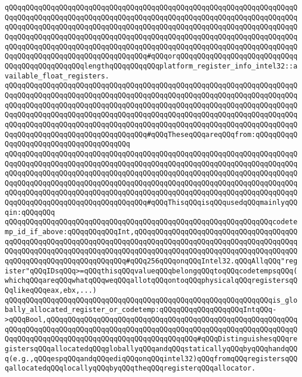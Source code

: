 \verb|qQQqqQQqqQQqqQQqqQQqqQQqqQQqqQQqqQQqqQQqqQQqqQQqqQQqqQQqqQQqqQQqqQQqqQQqqQQqqQQqqQQqqQQqqQQqqQQqqQQqqQQqqQQqqQQqqQQqqQQqqQQqqQQqqQQqqQQqqQQqqQQqqQQqqQQqqQQqqQQqqQQqqQQqqQQqqQQqqQQqqQQqqQQqqQQqqQQqqQQqqQQqqQQqqQQqqQQqqQQqqQQqqQQqqQQqqQQqqQQqqQQqqQQqqQQqqQQqqQQqqQQqqQQqqQQqqQQqqQQqqQQqqQQqqQQqqQQqqQQqqQQqqQQqqQQqqQQqqQQqqQQqqQQqqQQqqQQqqQQqqQQqqQQqqQQqqQQqqQQqqQQqqQQqqQQqqQQqqQQqqQQq#qQQqorqQQqqQQqqQQqqQQqqQQqqQQqqQQqqQQqqQQqqQQqqQQqqQQqlengthqQQqqQQqqQQqplatform_register_info_intel32::available_float_registers.|\newline
\verb|qQQqqQQqqQQqqQQqqQQqqQQqqQQqqQQqqQQqqQQqqQQqqQQqqQQqqQQqqQQqqQQqqQQqqQQqqQQqqQQqqQQqqQQqqQQqqQQqqQQqqQQqqQQqqQQqqQQqqQQqqQQqqQQqqQQqqQQqqQQqqQQqqQQqqQQqqQQqqQQqqQQqqQQqqQQqqQQqqQQqqQQqqQQqqQQqqQQqqQQqqQQqqQQqqQQqqQQqqQQqqQQqqQQqqQQqqQQqqQQqqQQqqQQqqQQqqQQqqQQqqQQqqQQqqQQqqQQqqQQqqQQqqQQqqQQqqQQqqQQqqQQqqQQqqQQqqQQqqQQqqQQqqQQqqQQqqQQqqQQqqQQqqQQqqQQqqQQqqQQqqQQqqQQqqQQqqQQqqQQqqQQq#qQQqTheseqQQqareqQQqfrom:qQQqqQQqqQQqqQQqqQQqqQQqqQQqqQQqqQQqqQQq|\newline
\verb|qQQqqQQqqQQqqQQqqQQqqQQqqQQqqQQqqQQqqQQqqQQqqQQqqQQqqQQqqQQqqQQqqQQqqQQqqQQqqQQqqQQqqQQqqQQqqQQqqQQqqQQqqQQqqQQqqQQqqQQqqQQqqQQqqQQqqQQqqQQqqQQqqQQqqQQqqQQqqQQqqQQqqQQqqQQqqQQqqQQqqQQqqQQqqQQqqQQqqQQqqQQqqQQqqQQqqQQqqQQqqQQqqQQqqQQqqQQqqQQqqQQqqQQqqQQqqQQqqQQqqQQqqQQqqQQqqQQqqQQqqQQqqQQqqQQqqQQqqQQqqQQqqQQqqQQqqQQqqQQqqQQqqQQqqQQqqQQqqQQqqQQqqQQqqQQqqQQqqQQqqQQqqQQqqQQqqQQqqQQqqQQq#qQQqThisqQQqisqQQqusedqQQqmainlyqQQqin:qQQqqQQq|\newline
\newline
\verb|qQQqqQQqqQQqqQQqqQQqqQQqqQQqqQQqqQQqqQQqqQQqqQQqqQQqqQQqqQQqqQQqcodetemp_id_if_above:qQQqqQQqqQQqInt,qQQqqQQqqQQqqQQqqQQqqQQqqQQqqQQqqQQqqQQqqQQqqQQqqQQqqQQqqQQqqQQqqQQqqQQqqQQqqQQqqQQqqQQqqQQqqQQqqQQqqQQqqQQqqQQqqQQqqQQqqQQqqQQqqQQqqQQqqQQqqQQqqQQqqQQqqQQqqQQqqQQqqQQqqQQqqQQqqQQqqQQqqQQqqQQqqQQqqQQqqQQqqQQq#qQQq256qQQqonqQQqIntel32.qQQqAllqQQq"register"qQQqIDsqQQq>=qQQqthisqQQqvalueqQQqbelongqQQqtoqQQqcodetempsqQQq(whichqQQqareqQQqwhatqQQqweqQQqallotqQQqontoqQQqphysicalqQQqregistersqQQqlikeqQQqeax,ebx,...)|\newline
\newline
\verb|qQQqqQQqqQQqqQQqqQQqqQQqqQQqqQQqqQQqqQQqqQQqqQQqqQQqqQQqqQQqqQQqis_globally_allocated_register_or_codetemp:qQQqqQQqqQQqqQQqqQQqIntqQQq->qQQqBool,qQQqqQQqqQQqqQQqqQQqqQQqqQQqqQQqqQQqqQQqqQQqqQQqqQQqqQQqqQQqqQQqqQQqqQQqqQQqqQQqqQQqqQQqqQQqqQQqqQQqqQQqqQQqqQQqqQQqqQQqqQQqqQQqqQQqqQQqqQQqqQQqqQQqqQQqqQQqqQQqqQQqqQQqqQQqqQQq#qQQqDistinguishesqQQqregistersqQQqallocatedqQQqgloballyqQQqandqQQqstaticallyqQQqbyqQQqhandqQQq(e.g.,qQQqespqQQqandqQQqediqQQqonqQQqintel32)qQQqfromqQQqregistersqQQqallocatedqQQqlocallyqQQqbyqQQqtheqQQqregisterqQQqallocator.|\newline

